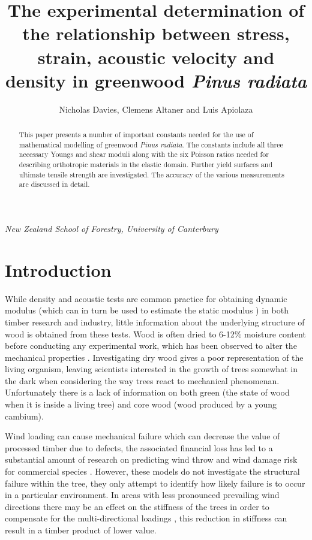 \documentclass[10pt]{article}
\begin{document}
\begin{titlepage}
\title{The experimental determination of the relationship between stress, strain, acoustic velocity and density in greenwood \textit{Pinus radiata}}
\author{Nicholas Davies, Clemens Altaner and Luis Apiolaza}
\maketitle
\emph{New Zealand School of Forestry, University of Canterbury}
\begin{abstract}
This paper presents a number of important constants needed for the use of
 mathematical modelling of greenwood \textit{Pinus radiata}. The constants include all three necessary Youngs and shear moduli along with the six Poisson ratios needed for describing orthotropic materials in the elastic domain. Further yield surfaces and ultimate tensile strength are investigated. The accuracy of the various measurements are discussed in detail.
\end{abstract}

\thispagestyle{empty}
\end{titlepage}
\setcounter{page}{1}

\section{Introduction}
While density and acoustic tests are common practice for obtaining dynamic modulus (which can in turn be used to estimate the static modulus \citep{barker_properties_1998,lindstrom_stiffness_2004}) in both timber research and industry, little information about the underlying structure of wood is obtained from these tests. Wood is often dried to 6-12\% moisture content before conducting any experimental work, which has been observed to alter the mechanical properties \citep{skaar_springer_1988,ozyhar_moisture-dependent_2013}. Investigating dry wood gives a poor representation of the living organism, leaving scientists interested in the growth of trees somewhat in the dark when considering the way trees react to mechanical phenomenan. Unfortunately there is a lack of information on both green (the state of wood when it is inside a living tree) and core wood (wood produced by a young cambium).

Wind loading can cause mechanical failure which can decrease the value of processed timber due to defects, the associated financial loss has led to a substantial amount of research on predicting wind throw and wind damage risk for commercial species \citep{gardiner_review_2008}. However, these models do not investigate the structural failure within the tree, they only attempt to identify how likely failure is to occur in a particular environment. In areas with less pronounced prevailing wind directions there may be an effect on the stiffness of the trees in order to compensate for the multi-directional loadings \citep{apiolaza_characterization_2011,kern_mechanical_2005}, this reduction in stiffness can result in a timber product of lower value.
\end{document}
